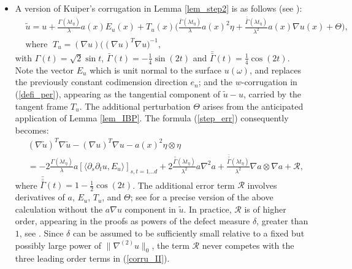 \documentclass[reqno,twoside,11pt]{amsart}
\newcommand*{\dbar}[1]{\bar{\bar{#1}}}
\newcommand*{\tbar}[1]{\bar{\dbar{#1}}}
\numberwithin{equation}{section}
\theoremstyle{plain}
\theoremstyle{definition}
\begin{document}
\begin{itemize}
\item[2.] A version of Kuiper's corrugation in Lemma \ref{lem_step2} is as follows (see \cite{CHI2, lew_full2d2k}):
\begin{equation*}        
\begin{split}
& \tilde u= u + \frac{\Gamma(\lambda t_\eta)}{\lambda} a(x)E_u(x) + 
T_{u}(x) \Big(\frac{\bar\Gamma(\lambda t_\eta)}{\lambda}a(x)^2\eta +
\frac{\dbar\Gamma(\lambda t_\eta)}{\lambda^2}a(x)\nabla u(x) + \Theta\Big),
\\ & \mbox{where }\; T_u = (\nabla u)\big((\nabla u)^T\nabla u\big)^{-1},
\end{split}
\end{equation*}
with $\Gamma(t) = \sqrt{2}\sin t$, $\bar\Gamma(t) = -\frac{1}{4}\sin
(2t)$ and $\dbar\Gamma(t) = \frac{1}{4}\cos (2t)$. 
Note the vector $E_u$ which is unit normal to the surface $u(\omega)$, 
and replaces the previously constant codimension direction $e_n$; and the
$w$-corrugation in (\ref{defi_per}), appearing as the tangential
component of $\tilde u - u$, carried by the tangent frame
$T_u$. The additional perturbation $\Theta$ arises from the
anticipated application of Lemma \ref{lem_IBP}. The formula
(\ref{step_err}) consequently becomes: 
\begin{equation}\label{corru_II}
\begin{split}
& (\nabla\tilde u)^T\nabla \tilde u - (\nabla u)^T\nabla u
-a(x)^2\eta\otimes \eta \\
& = -2\frac{\Gamma(\lambda t_\eta)}{\lambda} a [\langle\partial_s\partial_tu,
E_u\rangle]_{s,t=1\ldots d} + 2\frac{\dbar\Gamma(\lambda
  t_\eta)}{\lambda^2} a\nabla^2a + \frac{\tbar\Gamma(\lambda
  t_\eta)}{\lambda^2}\nabla a\otimes\nabla a +\mathcal{R},
\end{split}
\end{equation}
where $\tbar\Gamma(t) = 1-\frac{1}{2}\cos(2t)$. 
The additional error term $\mathcal{R}$ involves derivatives of $a$,
$E_u$, $T_u$, and $\Theta$; see \cite[Lemma 2.5]{lew_full2d2k} for a
precise version of the above calculation without the $a \nabla u$
component in $\tilde u$. In practice, $\mathcal{R}$ is of higher
order, appearing in the proofs as powers of the defect measure $\delta$,
greater than $1$, see \cite[Lemma 3.1]{CHI2}. Since
$\delta$ can be assumed to be sufficiently small relative to a fixed but
possibly large power of $\|\nabla^{(2)} u\|_0$, the term $\mathcal{R}$
never competes with the three leading order terms in (\ref{corru_II}).

\smallskip


\end{itemize}
\end{document}
